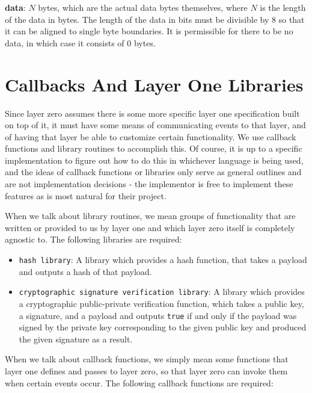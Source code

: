 \documentclass[12pt]{article}
\begin{document}
\textbf{data}: $N$ bytes, which are the actual data bytes themselves, where $N$ is the length of the data in bytes. The length of the data in bits must be divisible by 8 so that it can be aligned to single byte boundaries. It is permissible for there to be no data, in which case it consists of $0$ bytes.

\section{Callbacks And Layer One Libraries}
Since layer zero assumes there is some more specific layer one specification built on top of it, it must have some means of communicating events to that layer, and of having that layer be able to customize certain functionality. We use callback functions and library routines to accomplish this. Of course, it is up to a specific implementation to figure out how to do this in whichever language is being used, and the ideas of callback functions or libraries only serve as general outlines and are not implementation decisions - the implementor is free to implement these features as is most natural for their project.

When we talk about library routines, we mean groups of functionality that are written or provided to us by layer one and which layer zero itself is completely agnostic to. The following libraries are required:

\begin{itemize}
\item \texttt{hash library}: A library which provides a hash function, that takes a payload and outputs a hash of that payload.
\item \texttt{cryptographic signature verification library}: A library which provides a cryptographic public-private verification function, which takes a public key, a signature, and a payload and outputs \texttt{true} if and only if the payload was signed by the private key corresponding to the given public key and produced the given signature as a result.
\end{itemize}

When we talk about callback functions, we simply mean some functions that layer one defines and passes to layer zero, so that layer zero can invoke them when certain events occur. The following callback functions are required:
\end{document}
